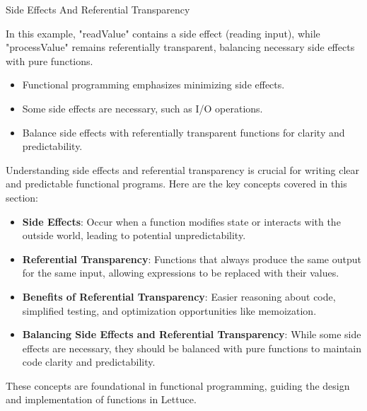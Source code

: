 \begin{notes}{Side Effects And Referential Transparency}
\begin{highlight}
        In this example, "readValue" contains a side effect (reading input), while "processValue" remains referentially transparent, balancing necessary side effects with pure functions.
    
        \begin{itemize}
            \item Functional programming emphasizes minimizing side effects.
            \item Some side effects are necessary, such as I/O operations.
            \item Balance side effects with referentially transparent functions for clarity and predictability.
        \end{itemize}
    
    \end{highlight}
    
    \begin{highlight}
    
        Understanding side effects and referential transparency is crucial for writing clear and predictable functional programs. Here are the key concepts covered in this section:
    
        \begin{itemize}
            \item \textbf{Side Effects}: Occur when a function modifies state or interacts with the outside world, leading to potential unpredictability.
            \item \textbf{Referential Transparency}: Functions that always produce the same output for the same input, allowing expressions to be replaced with their values.
            \item \textbf{Benefits of Referential Transparency}: Easier reasoning about code, simplified testing, and optimization opportunities like memoization.
            \item \textbf{Balancing Side Effects and Referential Transparency}: While some side effects are necessary, they should be balanced with pure functions to maintain code clarity and predictability.
        \end{itemize}
    
        These concepts are foundational in functional programming, guiding the design and implementation of functions in Lettuce.
    
    \end{highlight}
\end{notes}

